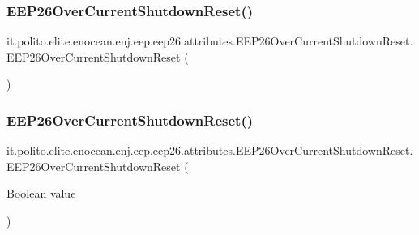 \subsubsection{\texorpdfstring{E\+E\+P26\+Over\+Current\+Shutdown\+Reset()}{EEP26OverCurrentShutdownReset()}\hspace{0.1cm}{\footnotesize\ttfamily [1/2]}}
{\footnotesize\ttfamily it.\+polito.\+elite.\+enocean.\+enj.\+eep.\+eep26.\+attributes.\+E\+E\+P26\+Over\+Current\+Shutdown\+Reset.\+E\+E\+P26\+Over\+Current\+Shutdown\+Reset (\begin{DoxyParamCaption}{ }\end{DoxyParamCaption})}

\hypertarget{classit_1_1polito_1_1elite_1_1enocean_1_1enj_1_1eep_1_1eep26_1_1attributes_1_1_e_e_p26_over_current_shutdown_reset_a711bacdaae4a654b9a4aa77e904dd086}{}\label{classit_1_1polito_1_1elite_1_1enocean_1_1enj_1_1eep_1_1eep26_1_1attributes_1_1_e_e_p26_over_current_shutdown_reset_a711bacdaae4a654b9a4aa77e904dd086} 
\subsubsection{\texorpdfstring{E\+E\+P26\+Over\+Current\+Shutdown\+Reset()}{EEP26OverCurrentShutdownReset()}\hspace{0.1cm}{\footnotesize\ttfamily [2/2]}}
{\footnotesize\ttfamily it.\+polito.\+elite.\+enocean.\+enj.\+eep.\+eep26.\+attributes.\+E\+E\+P26\+Over\+Current\+Shutdown\+Reset.\+E\+E\+P26\+Over\+Current\+Shutdown\+Reset (\begin{DoxyParamCaption}\item[{Boolean}]{value }\end{DoxyParamCaption})}



